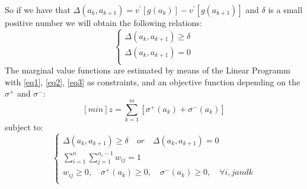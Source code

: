 \documentclass{report}
\begin{document}
So if we have that $\Delta (a_k, a_{k+1} ) = v^{'} [g(a_k)] - v^{'} [g(a_{k+1})]$ and $\delta$ is a small positive number we will obtain the following relations: 
\begin{equation}\label{eq3}
      \begin{cases}
      	\Delta (a_k, a_{k+1} ) \geq \delta\\
       	\Delta (a_k, a_{k+1} ) = 0 \\
      \end{cases}
\end{equation}
The marginal value functions are estimated by means of the Linear Programm with \eqref{eq1}, \eqref{eq2}, \eqref{eq3} as constraints, and an objective function depending on the $ \sigma^{+}$ and $\sigma^{-} $: 
$$ [min]z = \sum_{k=1}^{m} [ \sigma ^{+} (a_k) + \sigma ^{-} (a_k)]  $$
subject to: 
\begin{equation}\label{eq5}
      \begin{cases}
      	\Delta (a_k, a_{k+1} ) \geq \delta \quad or \quad \Delta (a_k, a_{k+1} ) = 0 \\
      	\sum_{i=1}^{n} \sum_{j=1}^{\alpha_i -1} w_{ij} = 1\\
       	w_{ij} \geq 0, \quad \sigma^{+}(a_k) \geq 0, \quad \sigma^{-}(a_k) \geq 0, \quad  \forall i, j  and  k\\
      \end{cases}
\end{equation}
\end{document}
